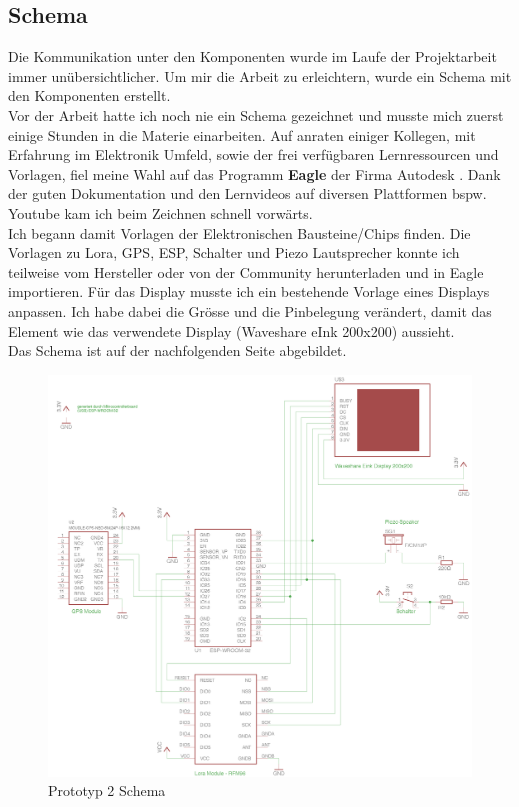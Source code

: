 \documentclass[11pt,english,german]{report}
\theoremstyle{definition}
\begin{document}
\subsection{Schema}
Die Kommunikation unter den Komponenten wurde im Laufe der Projektarbeit immer unübersichtlicher. Um mir die Arbeit zu erleichtern, wurde ein Schema mit den Komponenten erstellt.\\[0.3cm]
Vor der Arbeit hatte ich noch nie ein Schema gezeichnet und musste mich zuerst einige Stunden in die Materie einarbeiten. Auf anraten einiger Kollegen, mit Erfahrung im Elektronik Umfeld, sowie der frei verfügbaren Lernressourcen und Vorlagen, fiel meine Wahl auf das Programm \textbf{Eagle} der Firma Autodesk \cite{autodesk}. Dank der guten Dokumentation und den Lernvideos auf diversen Plattformen bspw. Youtube kam ich beim Zeichnen schnell vorwärts. \\[0.3cm] 
Ich begann damit Vorlagen der Elektronischen Bausteine/Chips finden. Die Vorlagen zu Lora, GPS, ESP, Schalter und Piezo Lautsprecher konnte ich teilweise vom Hersteller oder von der Community herunterladen und in Eagle importieren. Für das Display musste ich ein bestehende Vorlage eines Displays anpassen. Ich habe dabei die Grösse und die Pinbelegung verändert, damit das Element wie das verwendete Display (Waveshare eInk 200x200) aussieht. \\[0.3cm]
Das Schema ist auf der nachfolgenden Seite abgebildet.
\newpage

\begin{figure}[H]
	\centering
	\includegraphics[width=\textwidth]{img/prototype/prototyp_schema.png}
	\caption[Prototyp2 Schema]
	{Prototyp 2 Schema}
\end{figure}
\end{document}
